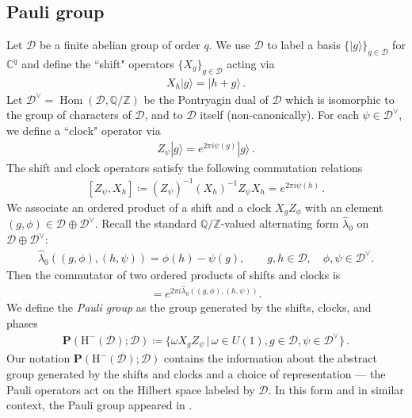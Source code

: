 \documentclass[sn-mathphys-num]{sn-jnl}
\theoremstyle{definition}
\numberwithin{equation}{section}
\theoremstyle{definition}
\def\CD {{\mathcal D}}
\def\CD {{\mathcal D}}
\def\hm{{\mbox{H}}^{-}}
\def\IC{\mathbb{C}}
\def\IQ{\mathbb{Q}}
\def\IZ{{\mathbb{Z}}}
\def\ra{\rangle}
\def\hl{{\hat \lambda}}
\def\Hom{\operatorname{Hom}}
\begin{document}
\subsection{Pauli group} \label{Sec:Pauligroup}  
Let $\CD$ be a finite abelian group of order $q$. We use $\CD$ to label a basis $\{|g\ra\}_{g\in \CD}$ for
$\IC^q$ and define the ``shift" operators $\{X_g\}_{g\in \CD}$ acting via
\begin{align}\label{eq:GenX}
    X_h|g\ra=|h+g\ra\,.
\end{align}
Let $\CD^{\vee}=\Hom(\CD,\IQ/\IZ)$ be the Pontryagin dual of $\CD$ which is isomorphic to the group of characters of $\CD$, and to $\CD$ itself (non-canonically). For each $\psi \in \CD^{\vee}$, we define a ``clock" operator via
\begin{align}\label{eq:GenZ}
    Z_{\psi}|g\ra=e^{2\pi i \psi(g)}|g\ra\,.
\end{align}
The shift and clock operators satisfy the following commutation relations
\begin{align}\label{eq:PauliRels}
    [Z_{\psi},X_h]\coloneqq(Z_{\psi})^{-1} (X_h)^{-1} Z_{\psi} X_h=e^{2\pi i \psi(h)}\,.
\end{align}
We associate an ordered product of a shift and a clock $X_gZ_{\phi}$ with an element $(g,\phi)\in\CD\oplus\CD^{\vee}$. Recall the standard $\IQ/\IZ$-valued alternating form $\hl_0$ on $\CD\oplus\CD^{\vee}$: 
\begin{align}
\hl_0((g,\phi),(h,\psi)) = \phi(h)-\psi(g), \qquad g,h\in\CD, \quad \phi,\psi\in\CD^{\vee}. 
\end{align}
Then the commutator of two ordered products of shifts and clocks is \begin{align} 
[X_gZ_{\phi},X_hZ_{\psi}] = e^{2\pi i\hl_0((g,\phi),(h,\psi))}.
\end{align}
We define the \textit{Pauli group} as the group generated by the shifts, clocks, and phases
\begin{align}\label{def:PauliGroup}
    \textbf{P}(\hm(\CD);\CD)\coloneqq \{\omega X_{g}Z_{\psi}\,|\,\omega\in U(1),g\in \CD,\psi\in \CD^{\vee}\}\,.
\end{align}
Our notation $\textbf{P}(\hm(\CD);\CD)$ contains the information about the abstract group generated by the shifts and clocks and a choice of representation --- the Pauli operators act on the Hilbert space labeled by $\CD$. In this form and in similar context, the Pauli group appeared in \cite{moses2024cliffordcircuitsnoncyclicabelian}.
\end{document}
